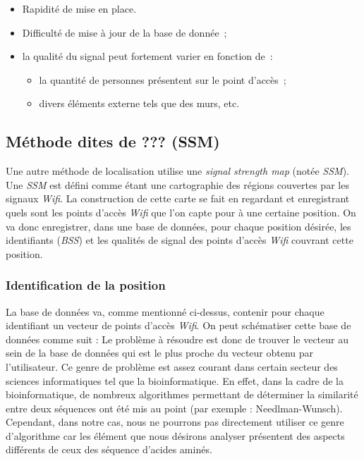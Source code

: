 \documentclass[11pt,a4paper]{article}
\begin{document}
    \begin{tcolorbox}[title=Avantages :]
      \begin{itemize}
        \item Rapidité de mise en place.
      \end{itemize}
    \end{tcolorbox}
    \begin{tcolorbox}[title=Désavantages :]
      \begin{itemize}
        \item Difficulté de mise à jour de la base de donnée~;
        \item la qualité du signal peut fortement varier en fonction de~:
          \begin{itemize}
            \item la quantité de personnes présentent sur le point d'accès~;
            \item divers éléments externe tels que des murs, etc.
        \end{itemize}
      \end{itemize}
    \end{tcolorbox}
  \subsection{Méthode dites de ??? (SSM)}
    Une autre méthode de localisation utilise une \textit{signal strength map} (notée \textit{SSM}). Une \textit{SSM} est défini comme étant une cartographie des régions couvertes par les signaux \textit{Wifi}. La construction de cette carte se fait en regardant et enregistrant quels sont les points d'accès \textit{Wifi} que l'on capte pour à une certaine position. On va donc enregistrer, dans une base de données, pour chaque position désirée, les identifiants (\textit{BSS}) et les qualités de signal des points d'accès \textit{Wifi} couvrant cette position.
    \subsubsection{Identification de la position}
      La base de données va, comme mentionné ci-dessus, contenir pour chaque identifiant un vecteur de points d'accès \textit{Wifi}. On peut schématiser cette base de données comme suit : 
      Le problème à résoudre est donc de trouver le vecteur au sein de la base de données qui est le plus proche du vecteur obtenu par l'utilisateur. Ce genre de problème est assez courant dans certain secteur des sciences informatiques tel que la bioinformatique. En effet, dans la cadre de la bioinformatique, de nombreux algorithmes permettant de déterminer la similarité entre deux séquences ont été mis au point (par exemple : Needlman-Wunsch). Cependant, dans notre cas, nous ne pourrons pas directement utiliser ce genre d'algorithme car les élément que nous désirons analyser présentent des aspects différents de ceux des séquence d'acides aminés.
\end{document}
